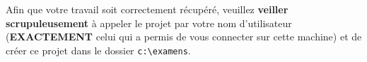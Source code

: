 
Afin que votre travail soit correctement r\'ecup\'er\'e, veuillez \textbf{veiller scrupuleusement} \`a appeler le projet par votre nom d'utilisateur (\textbf{EXACTEMENT} celui qui a permis de vous connecter sur cette machine) et de cr\'eer ce projet dans le dossier \texttt{c:\textbackslash examens}. 